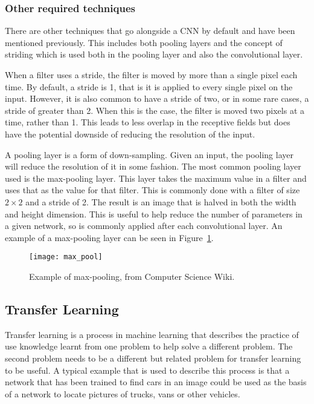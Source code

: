 \subsubsection{Other required techniques}

There are other techniques that go alongside a CNN by default and have been
mentioned previously. This includes both pooling layers and the concept of
striding which is used both in the pooling layer and also the convolutional
layer.

When a filter uses a stride, the filter is moved by more than a single pixel
each time. By default, a stride is 1, that is it is applied to every single pixel
on the input. However, it is also common to have a stride of two, or in some
rare cases, a stride of greater than 2. When this is the case, the filter
is moved two pixels at a time, rather than 1. This leads to less overlap in the
receptive fields but does have the potential downside of reducing the
resolution of the input.

A pooling layer is a form of down-sampling. Given an input, the pooling layer
will reduce the resolution of it in some fashion. The most common pooling layer
used is the max-pooling layer. This layer takes the maximum value in a filter
and uses that as the value for that filter. This is commonly done with a filter
of size $2 \times 2$ and a stride of 2. The result is an image that is halved
in both the width and height dimension. This is useful to help reduce the number
of parameters in a given network, so is commonly applied after each
convolutional layer. An example of a max-pooling layer can be seen in
Figure~\ref{fig:max_pool}.

\begin{figure}
    \centering
    \texttt{[image: max\_pool]}
    \caption{Example of max-pooling, from Computer Science Wiki\cite{max_pool}.}%
    \label{fig:max_pool}
\end{figure}

\subsection{Transfer Learning}

Transfer learning is a process in machine learning that describes the practice
of use knowledge learnt from one problem to help solve a different problem. The
second problem needs to be a different but related problem for transfer learning
to be useful. A typical example that is used to describe this process is that a
network that has been trained to find cars in an image could be used as the
basis of a network to locate pictures of trucks, vans or other vehicles.

